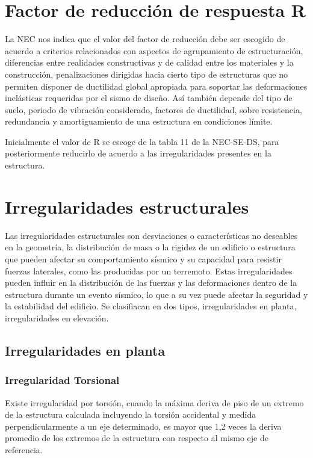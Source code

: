 \documentclass{report}
\begin{document}
\section{Factor de reducci\'on de respuesta R}
La NEC nos indica que el valor del factor de reducci\'on debe ser escogido de acuerdo a criterios relacionados con aspectos de agrupamiento de 
estructuraci\'on, diferencias entre realidades constructivas y de calidad entre los materiales y la construcci\'on, penalizaciones dirigidas hacia cierto tipo de estructuras 
que no permiten 
disponer de ductilidad global apropiada para soportar las deformaciones inel\'asticas requeridas por el sismo de dise\~{n}o. As\'i
tambi\'en depende del tipo de suelo, periodo de vibraci\'on considerado, factores de ductilidad, sobre resistencia, 
redundancia y amortiguamiento de una estructura en condiciones l\'imite.

Inicialmente el valor de R se escoge de la tabla 11 de la NEC-SE-DS, para posteriormente reducirlo de acuerdo a las irregularidades
presentes en la estructura.

\section{Irregularidades estructurales}
Las irregularidades estructurales son desviaciones o caracter\'isticas no deseables en la geometr\'ia, la distribuci\'on 
de masa o la rigidez de un edificio o estructura que pueden afectar su comportamiento s\'ismico y su capacidad para resistir fuerzas laterales, como las producidas por un terremoto. Estas irregularidades pueden influir en la distribuci\'on de las fuerzas y las deformaciones dentro de la estructura 
durante un evento s\'ismico, lo que a su vez puede afectar la seguridad y la estabilidad del edificio. Se clasifiacan en dos tipos,
irregularidades en planta, irregularidades en elevaci\'on.

\subsection{Irregularidades en planta}
\subsubsection{Irregularidad Torsional }
Existe irregularidad por torsi\'on, cuando la m\'axima deriva de piso de un extremo de la estructura calculada incluyendo la torsi\'on accidental y medida perpendicularmente a un eje determinado, es mayor que 1,2 veces la 
deriva promedio de los extremos de la estructura con respecto al mismo eje de referencia.
\end{document}
